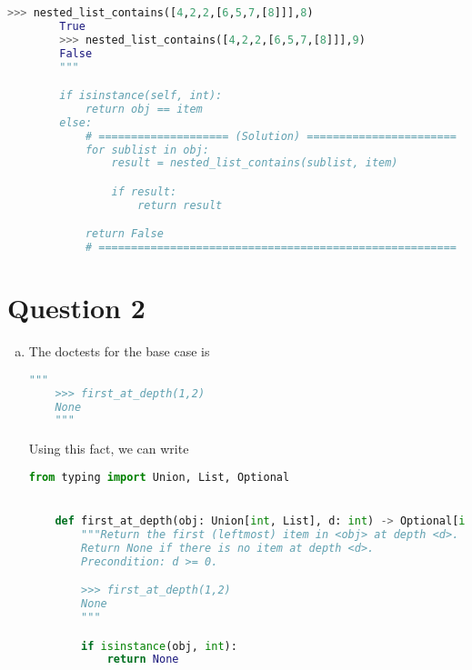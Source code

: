 \documentclass[12pt]{article}
\begin{document}
\begin{enumerate}[a.]
\begin{lstlisting}[language=python, caption={worksheet\_16\_q1c\_solution}]
        >>> nested_list_contains([4,2,2,[6,5,7,[8]]],8)
        True
        >>> nested_list_contains([4,2,2,[6,5,7,[8]]],9)
        False
        """

        if isinstance(self, int):
            return obj == item
        else:
            # ==================== (Solution) =======================
            for sublist in obj:
                result = nested_list_contains(sublist, item)

                if result:
                    return result

            return False
            # =======================================================
    \end{lstlisting}


\end{enumerate}

\section*{Question 2}
\begin{enumerate}[a.]
    \item The doctests for the base case is

    \begin{lstlisting}[language=python]
    """
    >>> first_at_depth(1,2)
    None
    """
    \end{lstlisting}

    \bigskip

    Using this fact, we can write

    \begin{lstlisting}[language=python,caption={worksheet\_16\_q2a\_solution}]
    from typing import Union, List, Optional


    def first_at_depth(obj: Union[int, List], d: int) -> Optional[int]:
        """Return the first (leftmost) item in <obj> at depth <d>.
        Return None if there is no item at depth <d>.
        Precondition: d >= 0.

        >>> first_at_depth(1,2)
        None
        """

        if isinstance(obj, int):
            return None
    \end{lstlisting}

\end{enumerate}
\end{document}
